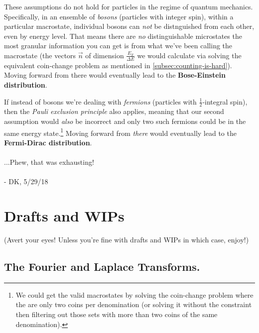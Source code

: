 \documentclass[letterpaper,12pt]{report}
\begin{document}
These assumptions do not hold for particles in the regime of quantum mechanics.
Specifically, in an ensemble of \emph{bosons} (particles with integer spin),
within a particular macrostate,
individual bosons can \emph{not} be distnguished from each other, even by energy level.
That means there are \emph{no} distinguishable microstates \textemdash{} the most granular
information you can get is from what we've been calling the macrostate
(the vectors \(\vec{n}\) of dimension \(\frac{E_T}{\Delta E}\) we would calculate via
solving the equivalent coin-change problem as mentioned in
\ref{subsec:counting-is-hard}).
Moving forward from there would eventually
lead to the \textbf{Bose-Einstein distribution}.\par

If instead of bosons we're dealing with \emph{fermions} (particles with
\(\frac{1}{2}\)-integral spin), then the \emph{Pauli exclusion principle} also applies,
meaning that our second assumption would \emph{also} be incorrect and only two such
fermions could be in the same energy state.\footnote{
  We could get the valid macrostates
  by solving the coin-change problem where the are only two coins per denomination
  (or solving it without the constraint then filtering out those sets with more than
  two coins of the same denomination).
}
Moving forward from \emph{there} would
eventually lead to the \textbf{Fermi-Dirac distribution}.
\\
\\
...Phew, that was exhausting!
\\
\\
- DK, 5/29/18


\chapter{Drafts and WIPs}\label{drafts-and-wips}

(Avert your eyes! Unless you're fine with drafts and WIPs \textemdash{} in which case, enjoy!)


\section{The Fourier and Laplace Transforms.}



\end{document}
